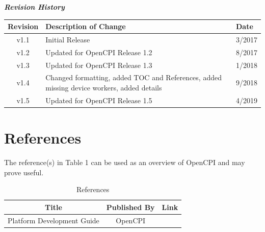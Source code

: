 	\begin{center}
	\textit{\textbf{Revision History}}
		\begin{table}[H]
		\label{table:revisions} %
			\begin{tabularx}{\textwidth}{|c|X|l|}
			\hline
			\rowcolor{blue}
			\textbf{Revision} & \textbf{Description of Change} & \textbf{Date} \\
		    \hline
		    v1.1 & Initial Release & 3/2017 \\
		    \hline
		    v1.2 & Updated for OpenCPI Release 1.2 & 8/2017 \\
			\hline
			v1.3 & Updated for OpenCPI Release 1.3 & 1/2018 \\
			\hline
			v1.4 & Changed formatting, added TOC and References, added missing device workers, added details & 9/2018 \\
			\hline
			v1.5 & Updated for OpenCPI Release 1.5 & 4/2019 \\
			\hline
			\end{tabularx}
		\end{table}
	\end{center}

\newpage
\tableofcontents

\newpage
\section{References}

The reference(s) in Table 1 can be used as an overview of OpenCPI and may prove useful.

\begin{center}
  \begin{table}[H]
  \begin{tabularx}{\textwidth}{|C|c|C|}
    \hline
    \textbf{Title} & \textbf{Published By} & \textbf{Link} \\
    \hline
	Platform Development Guide & OpenCPI & \\
    \hline
  \end{tabularx}
  \caption {References}
  \label{table:references}
  \end{table}
\end{center}

\newpage

